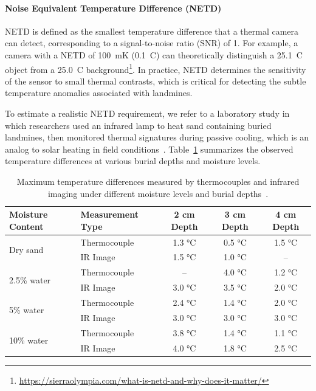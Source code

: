\paragraph{Noise Equivalent Temperature Difference (NETD)}

NETD is defined as the smallest temperature difference that a thermal camera can detect, corresponding to a signal-to-noise ratio (SNR) of 1. For example, a camera with a NETD of 100~mK (0.1~\textdegree C) can theoretically distinguish a 25.1~\textdegree C object from a 25.0~\textdegree C background\footnote{\url{https://sierraolympia.com/what-is-netd-and-why-does-it-matter/}}. In practice, NETD determines the sensitivity of the sensor to small thermal contrasts, which is critical for detecting the subtle temperature anomalies associated with landmines.

To estimate a realistic NETD requirement, we refer to a laboratory study in which researchers used an infrared lamp to heat sand containing buried landmines, then monitored thermal signatures during passive cooling, which is an analog to solar heating in field conditions~\cite{lamorski2002thermal}. Table~\ref{tab:netd_table} summarizes the observed temperature differences at various burial depths and moisture levels.

\begin{table}[H]
    \centering
    \footnotesize
    \renewcommand{\arraystretch}{1}
    \setlength{\tabcolsep}{6pt}
    \caption{Maximum temperature differences measured by thermocouples and infrared imaging under different moisture levels and burial depths~\cite{lamorski2002thermal}.}
    \label{tab:netd_table}
    \begin{tabular}{llccc}
        \toprule
        \textbf{Moisture Content} & \textbf{Measurement Type} & \textbf{2 cm Depth} & \textbf{3 cm Depth} & \textbf{4 cm Depth} \\
        \midrule
        \multirow{2}{*}{Dry sand} 
            & Thermocouple & 1.3 °C & 0.5 °C & 1.5 °C \\
            & IR Image     & 1.5 °C & 1.0 °C & -- \\
        \midrule
        \multirow{2}{*}{2.5\% water} 
            & Thermocouple & --     & 4.0 °C & 1.2 °C \\
            & IR Image     & 3.0 °C & 3.5 °C & 2.0 °C \\
        \midrule
        \multirow{2}{*}{5\% water} 
            & Thermocouple & 2.4 °C & 1.4 °C & 2.0 °C \\
            & IR Image     & 3.0 °C & 3.0 °C & 3.0 °C \\
        \midrule
        \multirow{2}{*}{10\% water} 
            & Thermocouple & 3.8 °C & 1.4 °C & 1.1 °C \\
            & IR Image     & 4.0 °C & 1.8 °C & 2.5 °C \\
        \bottomrule
    \end{tabular}
\end{table}

